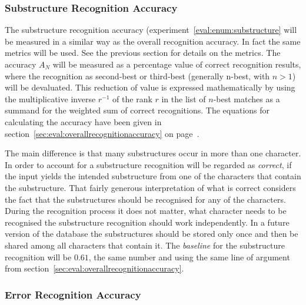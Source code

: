 \subsubsection{Substructure Recognition Accuracy}
\label{sec:eval:substructurerecognitionaccuracy}

The substructure recognition accuracy (experiment~\ref{eval:enum:substructure}
will be measured in a similar way as the overall recognition accuracy.
In fact the same metrics will be used. See the previous section for details
on the metrics. The accuracy \(A_{N}\) will be measured as a percentage value
of correct recognition results, where the recognition as second-best or 
third-best (generally n-best, with \(n>1\)) will be devaluated. %
This reduction of value is expressed mathematically by using the multiplicative 
inverse \(r^{-1}\) of the rank \(r\) in the list of \(n\)-best 
matches as a summand for the weighted sum of correct recognitions.
The equations for calculating the accuracy have been given in 
section~\ref{sec:eval:overallrecognitionaccuracy}
on page~\pageref{eval:accuracycalculation}.

The main difference is that many substructures occur in more than one 
character. In order to account for a substructure recognition will be regarded 
as \emph{correct}, if the input yields the intended substructure from
one of the characters that contain the substructure.
That fairly generous interpretation of what is correct considers the fact
that the substructures should be recognised for any of the characters.
During the recognition process it does not matter, what character needs to be
recognised the substructure recognition should work independently.
In a future version of the database the substructures should be stored only once
and then be shared among all characters that contain it.
The \emph{baseline} for the substructure recognition will be \(0.61\), 
the same number and using the same line of argument from 
section~\ref{sec:eval:overallrecognitionaccuracy}.

\subsubsection{Error Recognition Accuracy}
\label{sec:eval:errorrecognitionaccuracy}

